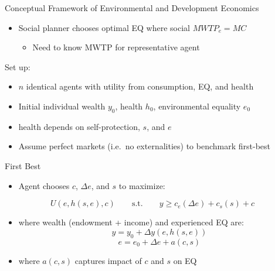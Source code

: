 \documentclass[
  ignorenonframetext,
  aspectratio=169]{beamer}
\providecommand{\tightlist}{%
  \setlength{\itemsep}{0pt}\setlength{\parskip}{0pt}}
\begin{document}
\begin{frame}{Conceptual Framework of Environmental and Development
Economics}
\protect\hypertarget{conceptual-framework-of-environmental-and-development-economics}{}
\begin{itemize}
\tightlist
\item
  Social planner chooses optimal EQ where social \(MWTP_{e} = MC\)

  \begin{itemize}
  \tightlist
  \item
    Need to know MWTP for representative agent
  \end{itemize}
\end{itemize}

\vfill

Set up:

\begin{itemize}
\tightlist
\item
  \(n\) identical agents with utility from consumption, EQ, and health
\item
  Initial individual wealth \(y_{0}\), health \(h_{0}\), environmental
  equality \(e_{0}\)
\item
  health depends on self-protection, \(s\), and \(e\)
\item
  Assume perfect markets (i.e.~no externalities) to benchmark first-best
\end{itemize}
\end{frame}

\begin{frame}{First Best}
\protect\hypertarget{first-best}{}
\begin{itemize}
\tightlist
\item
  Agent chooses \(c\), \(\Delta e\), and \(s\) to maximize:
\end{itemize}

\[ U(e, h(s,e), c) \quad \quad \text{s.t.} \quad \quad y \geq c_{e}(\Delta e) + c_{s}(s) + c\]

\begin{itemize}
\item
  where wealth (endowment + income) and experienced EQ are:
  \[y = y_{0} + \Delta y(e, h(s, e))\]
  \[e = e_{0} + \Delta e + a(c, s)\]
\item
  where \(a(c, s)\) captures impact of \(c\) and \(s\) on EQ
\end{itemize}
\end{frame}
\end{document}
